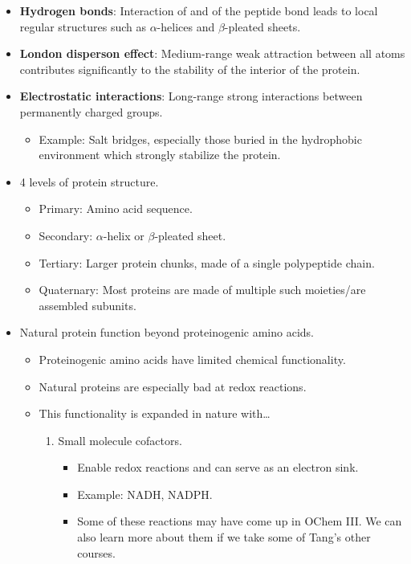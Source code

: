 \documentclass[../notes.tex]{subfiles}
\begin{document}
\begin{itemize}
    \item \textbf{Hydrogen bonds}: Interaction of  and  of the peptide bond leads to local regular structures such as $\alpha$-helices and $\beta$-pleated sheets.
    \item \textbf{London disperson effect}: Medium-range weak attraction between all atoms contributes significantly to the stability of the interior of the protein.
    \item \textbf{Electrostatic interactions}: Long-range strong interactions between permanently charged groups.
    \begin{itemize}
        \item Example: Salt bridges, especially those buried in the hydrophobic environment which strongly stabilize the protein.
    \end{itemize}
    \item 4 levels of protein structure.
    \begin{itemize}
        \item Primary: Amino acid sequence.
        \item Secondary: $\alpha$-helix or $\beta$-pleated sheet.
        \item Tertiary: Larger protein chunks, made of a single polypeptide chain.
        \item Quaternary: Most proteins are made of multiple such moieties/are assembled subunits.
    \end{itemize}
    \item Natural protein function beyond proteinogenic amino acids.
    \begin{itemize}
        \item Proteinogenic amino acids have limited chemical functionality.
        \item Natural proteins are especially bad at redox reactions.
        \item This functionality is expanded in nature with\dots
        \begin{enumerate}
            \item Small molecule cofactors.
            \begin{itemize}
                \item Enable redox reactions and can serve as an electron sink.
                \item Example: NADH, NADPH.
                \item Some of these reactions may have come up in OChem III. We can also learn more about them if we take some of Tang's other courses.

\end{itemize}
\end{enumerate}
\end{itemize}
\end{itemize}
\end{document}
